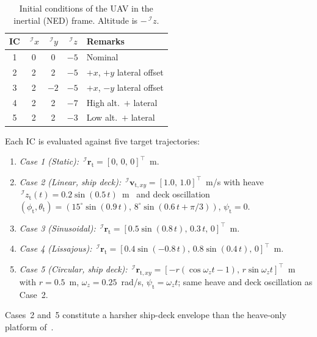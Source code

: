 \documentclass{IEEEtaes}
\begin{document}
\begin{table}[!t]
    \centering
    \caption{Initial conditions of the UAV in the inertial (NED) frame. Altitude is $-\,^\mathcal{I}z$.}
    \label{initial conditions: table}
    \begin{tabular}{ccccl}
    \toprule
        \textbf{IC} & $\,^\mathcal{I}x$ & $\,^\mathcal{I}y$ & $\,^\mathcal{I}z$ & \textbf{Remarks} \\
    \midrule
        1 & \phantom{-}0 & \phantom{-}0 & $-5$ & Nominal \\
        2 & \phantom{-}2 & \phantom{-}2 & $-5$ & $+x$, $+y$ lateral offset \\
        3 & \phantom{-}2 & $-2$         & $-5$ & $+x$, $-y$ lateral offset \\
        4 & \phantom{-}2 & \phantom{-}2 & $-7$ & High alt.\ $+$ lateral \\
        5 & \phantom{-}2 & \phantom{-}2 & $-3$ & Low alt.\ $+$ lateral \\
    \bottomrule
    \end{tabular}
\end{table}

Each IC is evaluated against five target trajectories:
\begin{enumerate}
    \item \textit{Case 1 (Static):}  $\,^\mathcal{I}\boldsymbol{r}_\text{t} = [0,\,0,\,0]^\top$~m.
    \item \textit{Case 2 (Linear, ship deck):} $\,^\mathcal{I}\boldsymbol{v}_{\text{t},xy} = [1.0,\,1.0]^\top$~m/s with heave $\,^\mathcal{I}z_\text{t}(t)=0.2\sin(0.5\,t)$~m~\cite{lin2022} and deck oscillation $(\phi_\text{t},\theta_\text{t})=(15^\circ\sin(0.9\,t),\,8^\circ\sin(0.6\,t+\pi/3))$, $\psi_\text{t}=0$.
    \item \textit{Case 3 (Sinusoidal):} $\,^\mathcal{I}\boldsymbol{r}_\text{t} = [0.5\sin(0.8\,t),\,0.3\,t,\,0]^\top$~m.
    \item \textit{Case 4 (Lissajous):} $\,^\mathcal{I}\boldsymbol{r}_\text{t} = [0.4\sin(-0.8\,t),\,0.8\sin(0.4\,t),\,0]^\top$~m.
    \item \textit{Case 5 (Circular, ship deck):} $\,^\mathcal{I}\boldsymbol{r}_{\text{t},xy} = [-r(\cos\omega_z t -1),\,r\sin\omega_z t]^\top$~m with $r=0.5$~m, $\omega_z = 0.25$~rad/s, $\psi_\text{t}=\omega_z t$; same heave and deck oscillation as Case~2.
\end{enumerate}
Cases~2 and~5 constitute a harsher ship-deck envelope than the heave-only platform of~\cite{lin2022}.
\end{document}
